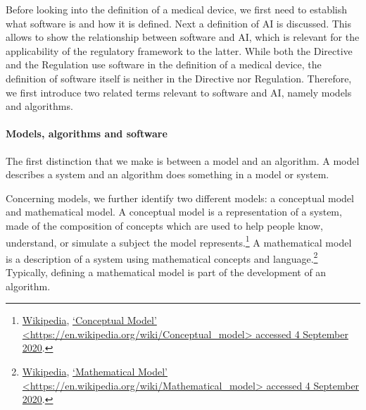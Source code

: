 \documentclass[
]{scrartcl}
\begin{document}
Before looking into the definition of a medical device, we first need to establish what software is and how it is defined. Next a definition of AI is discussed. This allows to show the relationship between software and AI, which is relevant for the applicability of the regulatory framework to the latter. While both the Directive and the Regulation use software in the definition of a medical device, the definition of software itself is neither in the Directive nor Regulation. Therefore, we first introduce two related terms relevant to software and AI, namely models and algorithms.

\hypertarget{models-algorithms-and-software}{%
\paragraph*{Models, algorithms and software}\label{models-algorithms-and-software}}

The first distinction that we make is between a model and an algorithm. A model describes a system and an algorithm does something in a model or system.

Concerning models, we further identify two different models: a conceptual model and mathematical model. A conceptual model is a representation of a system, made of the composition of concepts which are used to help people know, understand, or simulate a subject the model represents.\footnote{\protect\hyperlink{ref-wikipediaConceptualModel}{Wikipedia}, \protect\hyperlink{ref-wikipediaConceptualModel}{{`Conceptual Model'} \textless{}\url{https://en.wikipedia.org/wiki/Conceptual_model}\textgreater{} accessed 4 September 2020}.} A mathematical model is a description of a system using mathematical concepts and language.\footnote{\protect\hyperlink{ref-wikipediaMathematicalModel}{Wikipedia}, \protect\hyperlink{ref-wikipediaMathematicalModel}{{`Mathematical Model'} \textless{}\url{https://en.wikipedia.org/wiki/Mathematical_model}\textgreater{} accessed 4 September 2020}.} Typically, defining a mathematical model is part of the development of an algorithm.
\end{document}

